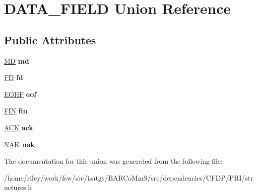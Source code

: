 \hypertarget{union_d_a_t_a___f_i_e_l_d}{}\section{D\+A\+T\+A\+\_\+\+F\+I\+E\+LD Union Reference}
\label{union_d_a_t_a___f_i_e_l_d}
\subsection*{Public Attributes}
\begin{DoxyCompactItemize}
\item 
\hyperlink{struct_m_d}{MD} {\bfseries md}\hypertarget{union_d_a_t_a___f_i_e_l_d_a113e1d1025382e5f2b4867db45ffe83f}{}\label{union_d_a_t_a___f_i_e_l_d_a113e1d1025382e5f2b4867db45ffe83f}

\item 
\hyperlink{struct_f_d}{FD} {\bfseries fd}\hypertarget{union_d_a_t_a___f_i_e_l_d_a267cc025fb313995b4dd0136c13c93f7}{}\label{union_d_a_t_a___f_i_e_l_d_a267cc025fb313995b4dd0136c13c93f7}

\item 
\hyperlink{struct_e_o_h_f}{E\+O\+HF} {\bfseries eof}\hypertarget{union_d_a_t_a___f_i_e_l_d_a828a520d475b098bc9f3b241a467c537}{}\label{union_d_a_t_a___f_i_e_l_d_a828a520d475b098bc9f3b241a467c537}

\item 
\hyperlink{struct_f_i_n}{F\+IN} {\bfseries fin}\hypertarget{union_d_a_t_a___f_i_e_l_d_a1cb02724adbc22940dd14ff3f416cfb1}{}\label{union_d_a_t_a___f_i_e_l_d_a1cb02724adbc22940dd14ff3f416cfb1}

\item 
\hyperlink{struct_a_c_k}{A\+CK} {\bfseries ack}\hypertarget{union_d_a_t_a___f_i_e_l_d_ac9a6232da12140a2d22cefeb7a244a65}{}\label{union_d_a_t_a___f_i_e_l_d_ac9a6232da12140a2d22cefeb7a244a65}

\item 
\hyperlink{struct_n_a_k}{N\+AK} {\bfseries nak}\hypertarget{union_d_a_t_a___f_i_e_l_d_aa4ac035bac0b657c409fdf9bd5413b8e}{}\label{union_d_a_t_a___f_i_e_l_d_aa4ac035bac0b657c409fdf9bd5413b8e}

\end{DoxyCompactItemize}


The documentation for this union was generated from the following file\+:\begin{DoxyCompactItemize}
\item 
/home/riley/work/fsw/src/isatgs/\+B\+A\+R\+Co\+Mm\+S/src/dependencies/\+C\+F\+D\+P/\+P\+R\+I/structures.\+h\end{DoxyCompactItemize}
